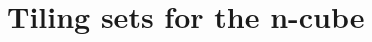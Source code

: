 \documentclass[../thesis.tex]{subfiles}
\begin{document}
\section{Tiling sets for the n-cube}











\end{document}
